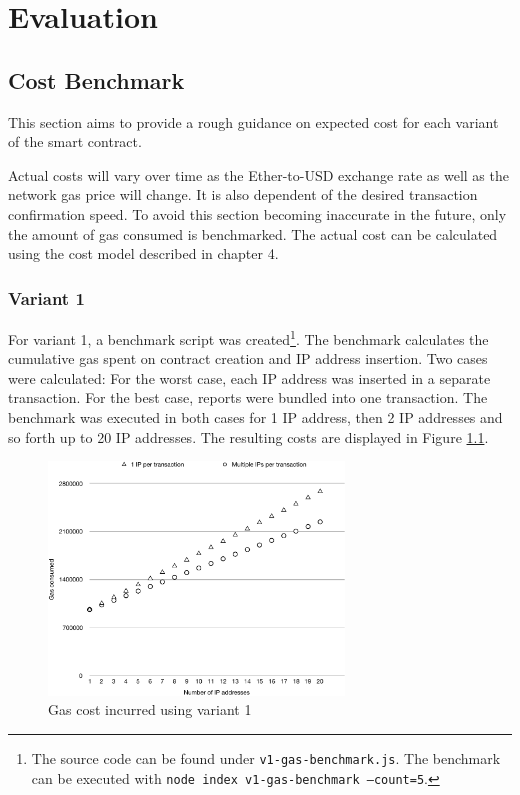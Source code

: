 \chapter{Evaluation}

\section{Cost Benchmark}

This section aims to provide a rough guidance on expected cost for each variant of the smart contract.

Actual costs will vary over time as the Ether-to-USD exchange rate as well as the network gas price will change. It is also dependent of the desired transaction confirmation speed. To avoid this section becoming inaccurate in the future, only the amount of gas consumed is benchmarked. The actual cost can be calculated using the cost model described in chapter 4.

\subsection{Variant 1}
For variant 1, a benchmark script was created\footnote{The source code can be found under \texttt{v1-gas-benchmark.js}. The benchmark can be executed with \texttt{node index v1-gas-benchmark --count=5}.}. The benchmark calculates the cumulative gas spent on contract creation and IP address insertion. Two cases were calculated: For the worst case, each IP address was inserted in a separate transaction. For the best case, reports were bundled into one transaction. The benchmark was executed in both cases for 1 IP address, then 2 IP addresses and so forth up to 20 IP addresses. The resulting costs are displayed in Figure \ref{fig:v1-gas-cost}.

\begin{figure}[H]
\centering
\includegraphics[width=0.7\textwidth]{v1-gas-cost.pdf}
\caption{Gas cost incurred using variant 1}
\label{fig:v1-gas-cost}
\end{figure}

